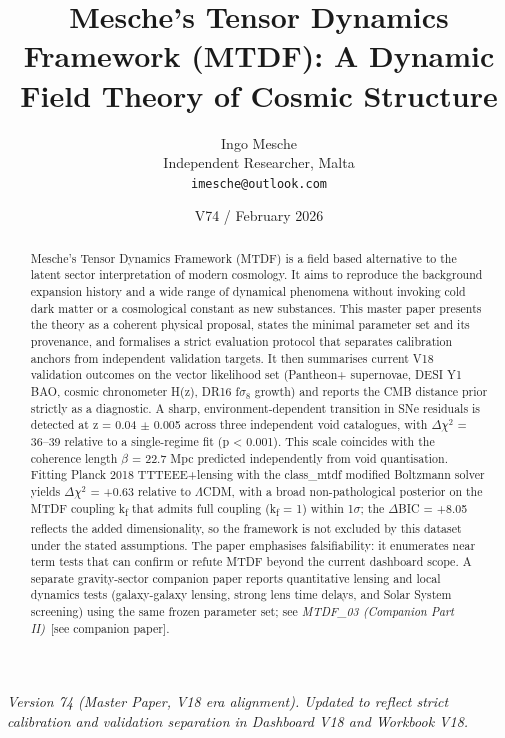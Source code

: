 \documentclass[11pt,a4paper]{article}
\title{Mesche's Tensor Dynamics Framework (MTDF): A Dynamic Field Theory of Cosmic Structure}
\author{Ingo Mesche\\ \small Independent Researcher, Malta \\ \small \texttt{imesche@outlook.com}}
\date{V74 / February 2026}
\begin{document}
\maketitle
\begin{center}\itshape Version 74 (Master Paper, V18 era alignment). Updated to reflect strict calibration and validation separation in Dashboard V18 and Workbook V18.\end{center}



\begin{abstract}
Mesche's Tensor Dynamics Framework (MTDF) is a field based alternative to the latent sector interpretation of modern cosmology. It aims to reproduce the background expansion history and a wide range of dynamical phenomena without invoking cold dark matter or a cosmological constant as new substances. This master paper presents the theory as a coherent physical proposal, states the minimal parameter set and its provenance, and formalises a strict evaluation protocol that separates calibration anchors from independent validation targets. It then summarises current V18 validation outcomes on the vector likelihood set (Pantheon+ supernovae, DESI Y1 BAO, cosmic chronometer H(z), DR16 f$\sigma$$_{8}$ growth) and reports the CMB distance prior strictly as a diagnostic. A sharp, environment-dependent transition in SNe residuals is detected at z = 0.04 $\pm$ 0.005 across three independent void catalogues, with $\Delta$$\chi$$^{2}$ = 36--39 relative to a single-regime fit (p < 0.001). This scale coincides with the coherence length $\beta$ = 22.7 Mpc predicted independently from void quantisation. Fitting Planck 2018 TTTEEE+lensing with the class\_\allowbreak{}mtdf modified Boltzmann solver yields $\Delta$$\chi$$^{2}$ = +0.63 relative to $\Lambda$CDM, with a broad non-pathological posterior on the MTDF coupling k\textsubscript{f} that admits full coupling (k\textsubscript{f} = 1) within 1$\sigma$; the $\Delta$BIC = +8.05 reflects the added dimensionality, so the framework is not excluded by this dataset under the stated assumptions. The paper emphasises falsifiability: it enumerates near term tests that can confirm or refute MTDF beyond the current dashboard scope. A separate gravity-sector companion paper reports quantitative lensing and local dynamics tests (galaxy-galaxy lensing, strong lens time delays, and Solar System screening) using the same frozen parameter set; see \textit{MTDF\_\allowbreak{}03 (Companion Part II)}~[see companion paper].
\end{abstract}
\end{document}
